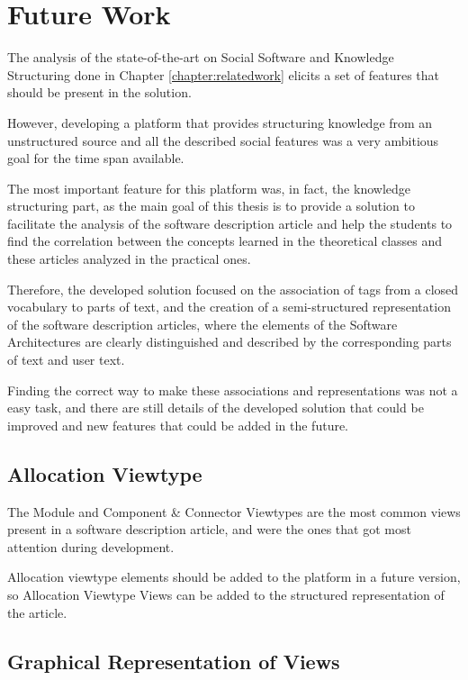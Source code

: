 
\chapter{Future Work}
\label{chapter:futureWork}

The analysis of the state-of-the-art on Social Software and Knowledge Structuring done in Chapter \ref{chapter:relatedwork} elicits a set of features that should be present in the solution.

However, developing a platform that provides structuring knowledge from an unstructured source and all the described social features was a very ambitious goal for the time span available. 

The most important feature for this platform was, in fact, the knowledge structuring part, as the main goal of this thesis is to provide a solution to facilitate the analysis of the software description article and help the students to find the correlation between the concepts learned in the theoretical classes and these articles analyzed in the practical ones.

Therefore, the developed solution focused on the association of tags from a closed vocabulary to parts of text, and the creation of a semi-structured representation of the software description articles, where the elements of the Software Architectures are clearly distinguished and described by the corresponding parts of text and user text.

Finding the correct way to make these associations and representations was not a easy task, and there are still details of the developed solution that could be improved and new features that could be added in the future.

\section{Allocation Viewtype}

The Module and Component \& Connector Viewtypes are the most common views present in a software description article, and were the ones that got most attention during development.

Allocation viewtype elements should be added to the platform in a future version, so Allocation Viewtype Views can be added to the structured representation of the article.

\section{Graphical Representation of Views}

